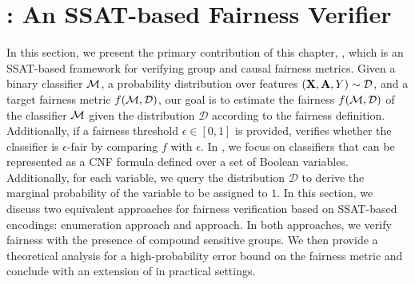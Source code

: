 \section{{\justicia}: An SSAT-based Fairness Verifier}
\label{fairness_justicia_sec:framework}
In this section, we present the primary contribution of this chapter, {\justicia}, which is an SSAT-based framework for verifying group and causal fairness metrics. Given a binary classifier $\alg$, a probability distribution over features $(\mathbf{X},\mathbf{A},Y) \sim \mathcal{D} $, and a target fairness metric $ f(\mathcal{M}, \mathcal{D}) $, our goal is to estimate the fairness $ f(\mathcal{M}, \mathcal{D}) $ of the classifier $ \alg $ given the distribution $ \mathcal{D} $ according to the fairness definition. Additionally, if a fairness threshold $ \epsilon \in [0,1] $ is provided, {\justicia} verifies whether the classifier is $ \epsilon $-fair by comparing $ f $ with $ \epsilon $. In {\justicia}, we focus on classifiers that can be represented as a CNF formula defined over a set of Boolean variables. Additionally, for each variable, we query the distribution $ \mathcal{D} $ to derive the marginal probability of the variable to be assigned to $ 1 $. In this section, we discuss two equivalent approaches for fairness verification based on SSAT-based encodings: enumeration approach and  approach. In both approaches, we verify fairness with the presence of compound sensitive groups.  We then provide a theoretical analysis for a high-probability error bound on the fairness metric and conclude with an extension of {\justicia} in practical settings.




\iffalse
In this section, we present the main contribution of this paper, {\justicia}, which is an SSAT framework for verifying independence and separation metrics of fairness. 
We first state the problem formally in Section~\ref{fairness_justicia_sec:problem_statement}. 
To verify fairness metrics in compound sensitive groups, we discuss an enumeration approach in Section~\ref{fairness_justicia_sec:enumeration_ssat} and an equivalent but more efficient learning approach in Section~\ref{fairness_justicia_sec:learn_ssat}. 
We conclude this section by proposing a conditional distribution based enumeration for compound sensitive groups in Section~\ref{fairness_justicia_sec:cond_ssat}. 


\subsection{Problem Statement}
\label{fairness_justicia_sec:problem_statement}
Given a binary classifier $\alg$ and a probability distribution over dataset $(X,A,Y) \sim \mathcal{D} $, our goal is to verify whether $\alg$ achieves independence and separation metrics with respect to the distribution $\mathcal{D}$. We  focus on a classifier that can be translated to a CNF formula of Boolean variables $\mathbf{B} $. 
The probability $ p_i $ of $\bool_i \in \mathbf{B}$ being assigned to $1$ is induced by the data generating distribution $\mathcal{D}$. 
In our contribution, we reduce the verification problem to solving appropriately designed SSAT instances.
\fi 

